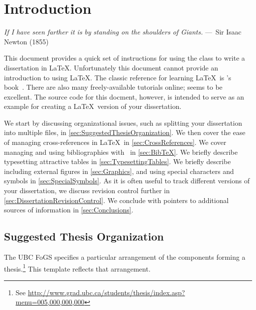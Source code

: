 
\chapter{Introduction}
\label{ch:Introduction}

\begin{epigraph}
    \emph{If I have seen farther it is by standing on the shoulders of
    Giants.} ---~Sir Isaac Newton (1855)
\end{epigraph}

This document provides a quick set of instructions for using the
 class to write a dissertation in \LaTeX. 
Unfortunately this document cannot provide an introduction to using
\LaTeX.  The classic reference for learning \LaTeX\ is
\citeauthor{lamport-1994-ladps}'s
book~\cite{lamport-1994-ladps}.  There are also many freely-available
tutorials online;
seems to be excellent.
The source code for this docment, however, is intended to serve as
an example for creating a \LaTeX\ version of your dissertation.

We start by discussing organizational issues, such as splitting
your dissertation into multiple files, in
\autoref{sec:SuggestedThesisOrganization}.
We then cover the ease of managing cross-references in \LaTeX\ in
\autoref{sec:CrossReferences}.
We cover managing and using bibliographies with \BibTeX\ in
\autoref{sec:BibTeX}. 
We briefly describe typesetting attractive tables in
\autoref{sec:TypesettingTables}.
We briefly describe including external figures in
\autoref{sec:Graphics}, and using special characters and symbols
in \autoref{sec:SpecialSymbols}.
As it is often useful to track different versions of your dissertation,
we discuss revision control further in
\autoref{sec:DissertationRevisionControl}. 
We conclude with pointers to additional sources of information in
\autoref{sec:Conclusions}.

\section{Suggested Thesis Organization}
\label{sec:SuggestedThesisOrganization}

The \acs{UBC} \acf{FoGS} specifies a particular arrangement of the
components forming a thesis.\footnote{See
    \url{http://www.grad.ubc.ca/students/thesis/index.asp?menu=005,000,000,000}}
This template reflects that arrangement.

